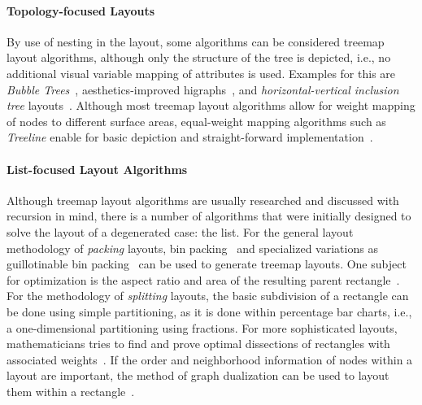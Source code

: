 \documentclass[sigconf%
,natbib=true%
]{acmart}
\begin{document}
\paragraph{\textbf{Topology-focused Layouts}}
By use of nesting in the layout, some algorithms can be considered treemap layout algorithms, although only the structure of the tree is depicted, i.e., no additional visual variable mapping of attributes is used.
Examples for this are \emph{Bubble Trees}~\cite{boardman2000-bubbletrees}, aesthetics-improved higraphs~\cite{harel2002-bloblayout}, and \emph{horizontal-vertical inclusion tree} layouts~\cite{pulo2003-zooming}.
Although most treemap layout algorithms allow for weight mapping of nodes to different surface areas, equal-weight mapping algorithms such as \emph{Treeline} enable for basic depiction and straight-forward implementation~\cite{langelier2005-qualityanalysis}.

\paragraph{\textbf{List-focused Layout Algorithms}}
Although treemap layout algorithms are usually researched and discussed with recursion in mind, there is a number of algorithms that were initially designed to solve the layout of a degenerated case: the list.
For the general layout methodology of \emph{packing} layouts, bin packing~\cite{johnson1991-spacefilling} and specialized variations as guillotinable bin packing~\cite{kroger1995-guillotinable} can be used to generate treemap layouts.
One subject for optimization is the aspect ratio and area of the resulting parent rectangle~\cite{brenner2018-packing}.
For the methodology of \emph{splitting} layouts, the basic subdivision of a rectangle can be done using simple partitioning, as it is done within percentage bar charts, i.e., a one-dimensional partitioning using fractions.
For more sophisticated layouts, mathematicians tries to find and prove optimal dissections of rectangles with associated weights~\cite{namagochi2007-dissecting,fugenschuh2014-exact}.
If the order and neighborhood information of nodes within a layout are important, the method of graph dualization can be used to layout them within a rectangle~\cite{yeap1995-graphdualization}.
\end{document}

